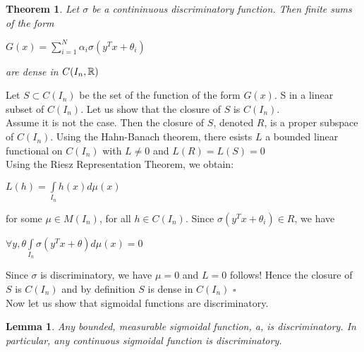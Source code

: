 \documentclass[12pt]{article}
\newtheorem{theorem}{Theorem}
\newtheorem{lemma}{Lemma}
\newenvironment{proof}{{\sc Proof:}}{\hfill $\square$}
\begin{document}
\begin{theorem}
  Let $\sigma$ be a contininuous discriminatory function. Then finite sums of the form\\\begin{center}
    $G(x) = \sum\limits_{i=1}^N \alpha_i \sigma(y^Tx + \theta_i)$
  \end{center}
  are dense in $C(I_n, \mathbb{R})$
\end{theorem}

\begin{proof}
  Let $S \subset C(I_n)$ be the set of the function of the form $G(x)$. S in a linear subset of $C(I_n)$. Let us show that the closure of $S$ is $C(I_n)$.\\
  Assume it is not the case. Then the closure of $S$, denoted $R$, is a proper subspace of $C(I_n)$. Using the Hahn-Banach theorem, there esists $L$ a bounded linear functional on $C(I_n)$ with $L \ne 0$ and  $L(R) = L(S) = 0$\\
  Using the Riesz Representation Theorem, we obtain:\\
  \begin{center}
    $L(h) = \int\limits_{I_n} h(x)d\mu(x)$
  \end{center}
  for some $\mu \in M(I_n)$, for all $h\in C(I_n)$. Since $\sigma(y^Tx + \theta_i)  \in R$, we have\\
  \begin{center}
    $\forall y, \theta \int\limits_{I_n} \sigma(y^Tx + \theta) d\mu(x) = 0$
  \end{center}
  Since $\sigma$ is discriminatory, we have $\mu = 0$ and $L = 0$ follows!
  Hence the closure of $S$ is $C(I_n)$ and by definition $S$ is dense in $C(I_n)$
\end{proof}\\
\Sv
  Now let us show that sigmoidal functions are discriminatory.
  \begin{lemma}
    Any bounded, measurable sigmoidal function, a, is discriminatory. In particular, any continuous sigmoidal function is discriminatory.
  \end{lemma}
\end{document}
